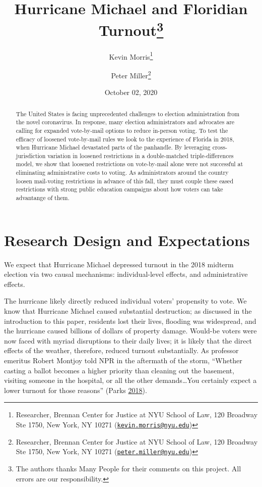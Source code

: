 \documentclass[
  12pt,
]{article}
\title{Hurricane Michael and Floridian Turnout\thanks{The authors thanks Many People for their comments on this project. All errors are our responsibility.}}
\author{Kevin Morris\footnote{Researcher, Brennan Center for Justice at NYU School of Law, 120 Broadway Ste 1750, New York, NY 10271 (\href{mailto:kevin.morris@nyu.edu}{\nolinkurl{kevin.morris@nyu.edu}})} \and Peter Miller\footnote{Researcher, Brennan Center for Justice at NYU School of Law, 120 Broadway Ste 1750, New York, NY 10271 (\href{mailto:peter.miller@nyu.edu}{\nolinkurl{peter.miller@nyu.edu}})}}
\date{October 02, 2020}
\begin{document}
\maketitle
\begin{abstract}
The United States is facing unprecedented challenges to election administration from the novel coronavirus. In response, many election administrators and advocates are calling for expanded vote-by-mail options to reduce in-person voting. To test the efficacy of loosened vote-by-mail rules we look to the experience of Florida in 2018, when Hurricane Michael devastated parts of the panhandle. By leveraging cross-jurisdiction variation in loosened restrictions in a double-matched triple-differences model, we show that loosened restrictions on vote-by-mail alone were not successful at eliminating administrative costs to voting. As administrators around the country loosen mail-voting restrictions in advance of this fall, they must couple these eased restrictions with strong public education campaigns about how voters can take advantange of them.
\end{abstract}

\pagebreak

\doublespacing

\hypertarget{research-design-and-expectations}{%
\section*{Research Design and Expectations}\label{research-design-and-expectations}}

We expect that Hurricane Michael depressed turnout in the 2018 midterm election via two causal mechanisms: individual-level effects, and administrative effects.

The hurricane likely directly reduced individual voters' propensity to vote. We know that Hurricane Michael caused substantial destruction; as discussed in the introduction to this paper, residents lost their lives, flooding was widespread, and the hurricane caused billions of dollars of property damage. Would-be voters were now faced with myriad disruptions to their daily lives; it is likely that the direct effects of the weather, therefore, reduced turnout substantially. As professor emeritus Robert Montjoy told NPR in the aftermath of the storm, ``Whether casting a ballot becomes a higher priority than cleaning out the basement, visiting someone in the hospital, or all the other demands\ldots You certainly expect a lower turnout for those reasons'' (Parks \protect\hyperlink{ref-Parks2018}{2018}).
\end{document}
